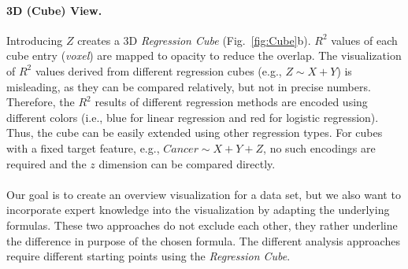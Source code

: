 \documentclass[journal]{style/vgtc} 			          %
\begin{document}
\paragraph{3D (Cube) View.}
Introducing $Z$ creates a 3D \emph{Regression Cube} (Fig.~\ref{fig:Cube}b).
$R^2$ values of each cube entry (\emph{voxel}) are mapped to opacity to reduce the overlap.
The visualization of $R^2$ values derived from different regression cubes (e.g., $Z \sim X + Y$) is misleading, as they can be compared relatively, but not in precise numbers.
Therefore, the $R^2$ results of different regression methods are encoded using different colors (i.e., blue for linear regression and red for logistic regression).
Thus, the cube can be easily extended using other regression types.
For cubes with a fixed target feature, e.g., $Cancer \sim X + Y + Z$, no such encodings are required and the $z$ dimension can be compared directly.
\\\\
Our goal is to create an overview visualization for a data set, but we also want to incorporate expert knowledge into the visualization by adapting the underlying formulas.
These two approaches do not exclude each other, they rather underline the difference in purpose of the chosen formula.
The different analysis approaches require different starting points using the \emph{Regression Cube}.
\end{document}
